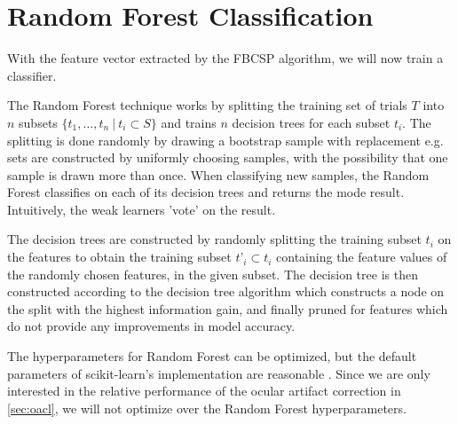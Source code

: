 \section{Random Forest Classification}\label{sec:randomforest}
With the feature vector extracted by the FBCSP algorithm, we will now train a classifier.

The Random Forest technique works by splitting the training set of trials $T$ into $n$ subsets $\{t_1,…,t_n \ | \ t_i \subset S\}$ and trains $n$ decision trees for each subset $t_i$. The splitting is done randomly by drawing a bootstrap sample with replacement e.g. sets are constructed by uniformly choosing samples, with the possibility that one sample is drawn more than once. When classifying new samples, the Random Forest classifies on each of its decision trees and returns the mode result. Intuitively, the weak learners 'vote' on the result.

The decision trees are constructed by randomly splitting the training subset $t_i$ on the features to obtain the training subset $t’_i \subset t_i$ containing the feature values of the randomly chosen features, in the given subset. The decision tree is then constructed according to the decision tree algorithm which constructs a node on the split with the highest information gain, and finally pruned for features which do not provide any improvements in model accuracy.

The hyperparameters for Random Forest can be optimized, but the default parameters of scikit-learn's implementation are reasonable \citep{bernard2009influence}. Since we are only interested in the relative performance of the ocular artifact correction in \cref{sec:oacl}, we will not optimize over the Random Forest hyperparameters.